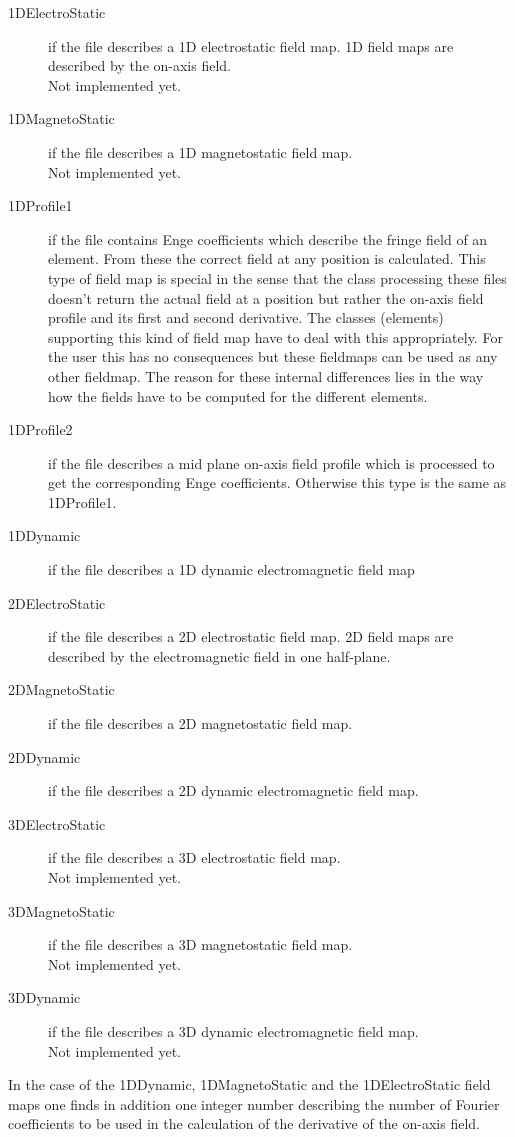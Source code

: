 \begin{description}
\item[1DElectroStatic]
if the file describes a 1D electrostatic field map. 1D field maps are described by the on-axis field.\\
Not implemented yet.
\item[1DMagnetoStatic]
if the file describes a 1D magnetostatic field map.\\
Not implemented yet.
\item[1DProfile1]
if the file contains Enge coefficients which describe the fringe field of an element. From these the correct field at any position is calculated. This type of field map is special in the sense that the class processing these files doesn't return the actual field at a position but rather the on-axis field profile and its first and second derivative. The classes (elements) supporting this kind of field map have to deal with this appropriately. For the user this has no consequences but these fieldmaps can be used as any other fieldmap. The reason for these internal differences lies in the way how the fields have to be computed for the different elements.
\item[1DProfile2]
if the file describes a mid plane on-axis field profile which is processed to get the corresponding Enge coefficients. Otherwise this type is the same as 1DProfile1. 
\item[1DDynamic]
if the file describes a 1D dynamic electromagnetic field map
\item[2DElectroStatic]
if the file describes a 2D electrostatic field map. 2D field maps are described by the electromagnetic field in one half-plane.
\item[2DMagnetoStatic]
if the file describes a 2D magnetostatic field map.
\item[2DDynamic]
if the file describes a 2D dynamic electromagnetic field map.
\item[3DElectroStatic]
if the file describes a 3D electrostatic field map.\\
Not implemented yet.
\item[3DMagnetoStatic]
if the file describes a 3D magnetostatic field map.\\
Not implemented yet.
\item[3DDynamic]
if the file describes a 3D dynamic electromagnetic field map.\\
Not implemented yet.
\end{description}
In the case of the 1DDynamic, 1DMagnetoStatic and the 1DElectroStatic field maps one finds in addition one integer number describing the number of Fourier coefficients to be used in the calculation of the derivative of the on-axis field. 

